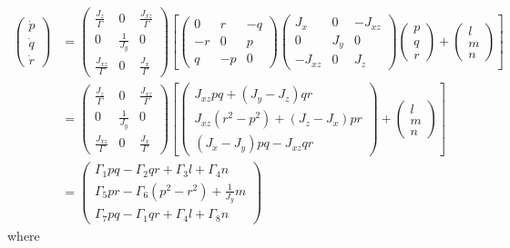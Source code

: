 \begin{equation}\label{eq:body_rate_derivation}
\begin{split}
 \begin{pmatrix}
  \dot{p} \\
  \dot{q} \\
  \dot{r} 
 \end{pmatrix}
 &=
 \begin{pmatrix}
 \frac{J_z}{\Gamma} & 0 & \frac{J_{xz}}{\Gamma}\\
 0 & \frac{1}{J_y} & 0\\
 \frac{J_{xz}}{\Gamma} & 0 & \frac{J_x}{\Gamma}
 \end{pmatrix}
 \left[
 \begin{pmatrix}
  0& r& -q \\
  -r& 0& p \\
  q& -p& 0
 \end{pmatrix}
 \begin{pmatrix}
 J_x & 0 & -J_{xz}\\
 0 & J_y & 0\\
 -J_{xz} & 0 & J_z
 \end{pmatrix}
 \begin{pmatrix}
  p\\
  q\\
  r
 \end{pmatrix} +
 \begin{pmatrix}
  l\\
  m\\
  n
 \end{pmatrix}
 \right] \\ 
 &=
 \begin{pmatrix}
  \frac{J_z}{\Gamma} & 0 & \frac{J_{xz}}{\Gamma}\\
  0 & \frac{1}{J_y} & 0\\
  \frac{J_{xz}}{\Gamma} & 0 & \frac{J_x}{\Gamma}
 \end{pmatrix}
 \left[
 \begin{pmatrix}
 J_{xz}pq+(J_y-J_z)qr\\
 J_{xz}(r^2-p^2)+(J_z-J_x)pr\\
 (J_x-J_y)pq-J_{xz}qr
 \end{pmatrix}+
 \begin{pmatrix}
  l\\
  m\\
  n
 \end{pmatrix}
 \right]\\ 
 &=
 \begin{pmatrix}
  \Gamma_1pq-\Gamma_2qr+\Gamma_3l+\Gamma_4n\\
  \Gamma_5pr-\Gamma_6(p^2-r^2)+\frac{1}{J_y}m\\
  \Gamma_7pq-\Gamma_1qr+\Gamma_4l+\Gamma_8n
 \end{pmatrix}
 \end{split}  
\end{equation}
where

